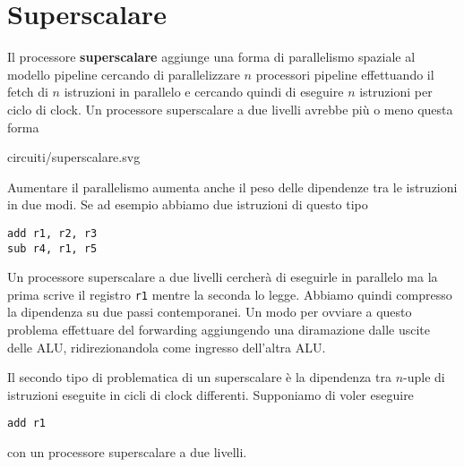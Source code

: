 \section{Superscalare}
Il processore \textbf{superscalare} aggiunge una forma di parallelismo spaziale al modello pipeline
cercando di parallelizzare $n$ processori pipeline effettuando il fetch di $n$ istruzioni in
parallelo e cercando quindi di eseguire $n$ istruzioni per ciclo di clock. Un processore
superscalare a due livelli avrebbe più o meno questa forma
\begin{center}
	 {circuiti/superscalare.svg}
\end{center}
Aumentare il parallelismo aumenta anche il peso delle dipendenze tra le istruzioni in due modi. Se
ad esempio abbiamo due istruzioni di questo tipo
\begin{verbatim}
add r1, r2, r3
sub r4, r1, r5
\end{verbatim}
Un processore superscalare a due livelli cercherà di eseguirle in parallelo ma la prima scrive il
registro \verb|r1| mentre la seconda lo legge. Abbiamo quindi compresso la dipendenza su due passi
contemporanei. Un modo per ovviare a questo problema effettuare del forwarding aggiungendo una
diramazione dalle uscite delle ALU, ridirezionandola come ingresso dell'altra ALU.

Il secondo tipo di problematica di un superscalare è la dipendenza tra $n$-uple di istruzioni
eseguite in cicli di clock differenti. Supponiamo di voler eseguire
\begin{verbatim}
add r1
\end{verbatim}
con un processore superscalare a due livelli.